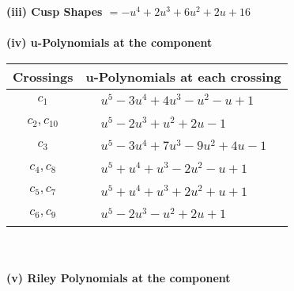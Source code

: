 \documentclass[1p]{elsarticle_modified}
\theoremstyle{definition}
\begin{document}
\flushleft \textbf{(iii) Cusp Shapes $= - u^4+2 u^3+6 u^2+2 u+16$}\\~\\
\newpage\renewcommand{\arraystretch}{1}
\flushleft \textbf{(iv) u-Polynomials at the component}\newline \\
\begin{tabular}{m{50pt}|m{274pt}}
Crossings & \hspace{64pt}u-Polynomials at each crossing \\
\hline $$\begin{aligned}c_{1}\end{aligned}$$&$\begin{aligned}
&u^5-3 u^4+4 u^3- u^2- u+1
\end{aligned}$\\
\hline $$\begin{aligned}c_{2},c_{10}\end{aligned}$$&$\begin{aligned}
&u^5-2 u^3+u^2+2 u-1
\end{aligned}$\\
\hline $$\begin{aligned}c_{3}\end{aligned}$$&$\begin{aligned}
&u^5-3 u^4+7 u^3-9 u^2+4 u-1
\end{aligned}$\\
\hline $$\begin{aligned}c_{4},c_{8}\end{aligned}$$&$\begin{aligned}
&u^5+u^4+u^3-2 u^2- u+1
\end{aligned}$\\
\hline $$\begin{aligned}c_{5},c_{7}\end{aligned}$$&$\begin{aligned}
&u^5+u^4+u^3+2 u^2+u+1
\end{aligned}$\\
\hline $$\begin{aligned}c_{6},c_{9}\end{aligned}$$&$\begin{aligned}
&u^5-2 u^3- u^2+2 u+1
\end{aligned}$\\
\hline
\end{tabular}\\~\\
\newpage\renewcommand{\arraystretch}{1}
\flushleft \textbf{(v) Riley Polynomials at the component}\newline \\
\end{document}
